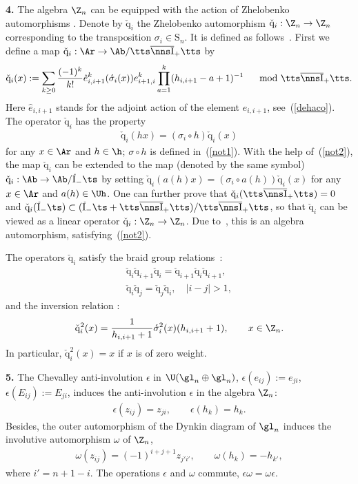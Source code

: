 \documentclass[11pt]{article}
\def\Ib{\tts\overline{\nns\rm I}_+\tts}\def\J{\mathrm{J}}\def\Jb{\,\overline{\!\rm I}_-\ts}\def\k{\mathfrak{k}}
\def\nplus{\mathfrak{n}}\def\nn{\nonumber}\def\nin{\noindent}
\def\q{\check{\mathrm q}}\def\Q{\mathrm{Q}}\def\r#1{(\ref{#1})}\let\rf=\r
\def\s{z}\def\S{\mathrm {S}}\def\si{\sigma}\def\Sp{\S^{\nplus}}\def\sy{\acute{\sigma}}\def\th{\mathring{h}}
\numberwithin{equation}{section}
\begin{document}
{\bf 4.} The algebra $\Z_n$ can be equipped with the action of Zhelobenko automorphisms \cite{KO}.  Denote by $\q_{i}$  the Zhelobenko
automorphism $\q_i:\Z_n\to\Z_n$  corresponding to the transposition $\si_i\in\S_n$. It is def\/ined as follows~\cite{KO}. First we def\/ine a map
$\q_i:\Ar\to \Ab/\Ib$ by
\begin{gather} \label{not7}
\q_i(x):=\sum_{k\geq 0}\frac{(-1)^k}{k!} \hat{e}_{i,i+1}^k(\sy_i(x)) e_{i+1,i}^k   \prod_{a=1}^k(h_{i,i+1}-a+1)^{-1}
\quad \mod\Ib  .
\end{gather}
Here $\hat{e}_{i,i+1}$ stands for the adjoint action of the element $e_{i,i+1}$, see~\rf{dehaco}.
The operator $\q_i$ has the property
\begin{gather}
\label{not2}
\q_i(hx)=(\si_i\circ h)\q_i(x)
\end{gather}
for any $x\in\Ar$ and  $h\in\h$; $\si\circ h$ is def\/ined in~\rf{not1}. With the help of~(\ref{not2}), the map $\q_i$ can be extended
to the map (denoted by the same symbol) $\q_i:\Ab\to \Ab/\Jb$ by
setting $\q_i(a(h)x)=(\si_i\circ a(h))\q_i(x)$ for any $x\in\Ar$ and
$a(h)\in\Uh$. One can further prove that $\q_i(\Ib)=0$ and $\q_i(\Jb)\subset (\Jb+\Ib)/\Ib$,
so that $\q_i$ can be viewed as a linear operator $\q_i:\Z_n\to\Z_n$. Due to~\cite{KO},
this is an algebra automorphism, satisfying~\rf{not2}.


The operators $\q_i$ satisfy the braid group relations~\cite{Zh}:
\begin{gather*}
\q_i\q_{i+1}\q_i=\q_{i+1}\q_{i}\q_{i+1}  ,\\
\q_i\q_j=\q_j\q_i  ,\quad |i-j|>1  ,
\end{gather*}
and the inversion relation \cite{KO}:
\begin{gather}
\label{invr}
\q_i^2(x)=\frac{1}{h_{i,i+1}+1}  \sy_i^2(x)  (h_{i,i+1}+1)  ,\qquad x\in\Z_n  .
\end{gather}
In particular, $\q_i^2(x)=x$ if $x$ is of zero weight.

{\bf 5.} The Chevalley anti-involution $\epsilon$ in $\U(\gl_n\oplus\gl_n)$,
$\epsilon(e_{ij}):=e_{ji}$, $\epsilon(E_{ij}):=E_{ji}$, induces the anti-involution $\epsilon$ in
the algebra $\Z_n$:
\begin{gather}
\epsilon(\s_{ij})=\s_{ji}  ,\qquad \epsilon(h_k)=h_k  .\label{anep}
\end{gather}
Besides, the outer automorphism of the Dynkin diagram of $\gl_n$ induces the involutive automorphism
$\omega$ of $\Z_n$,
\begin{gather}
\label{not2a}
\omega(\s_{ij}) =(-1)^{i+j+1}\s_{j'i'}  ,\qquad \omega (h_k)=-h_{k'}  ,
\end{gather}
where $i'=n+1-i$. The operations $\epsilon$ and $\omega$ commute, $\epsilon\omega =\omega\epsilon$.
\end{document}
